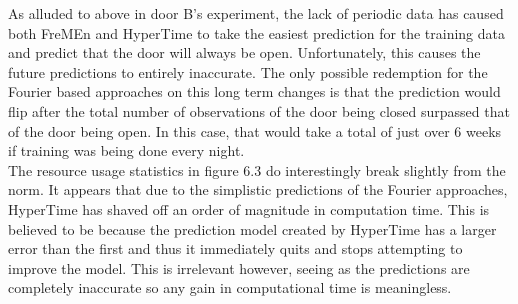 \begin{table}[h!]
  \centering

  \caption{Door C Data Overview}
\end{table}

As alluded to above in door B's experiment, the lack of periodic data has
caused both FreMEn and HyperTime to take the easiest prediction for the
training data and predict that the door will always be open. Unfortunately,
this causes the future predictions to entirely inaccurate. The only possible redemption
for the Fourier based approaches on this long term changes is that the
prediction would flip after the total number of observations of the door being
closed surpassed that of the door being open. In this case, that would take a
total of just over 6 weeks if training was being done every night. \\

The resource usage statistics in figure 6.3 do interestingly break slightly
from the norm. It appears that due to the simplistic predictions of the
Fourier approaches, HyperTime has shaved off an order of magnitude in
computation time. This is believed to be because the prediction model created
by HyperTime has a larger error than the first and thus it immediately quits
and stops attempting to improve the model. This is irrelevant however, seeing
as the predictions are completely inaccurate so any gain in computational time
is meaningless.

